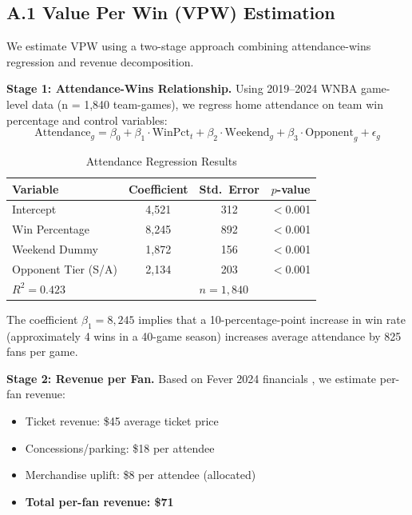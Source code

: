 \documentclass{mcmthesis}
\begin{document}
\subsection*{A.1 Value Per Win (VPW) Estimation}

We estimate VPW using a two-stage approach combining attendance-wins regression and revenue decomposition.

\textbf{Stage 1: Attendance-Wins Relationship.} Using 2019--2024 WNBA game-level data (n = 1,840 team-games), we regress home attendance on team win percentage and control variables:
\begin{equation}
\text{Attendance}_g = \beta_0 + \beta_1 \cdot \text{WinPct}_t + \beta_2 \cdot \text{Weekend}_g + \beta_3 \cdot \text{Opponent}_g + \epsilon_g
\end{equation}

\begin{table}[H]
\centering
\caption{Attendance Regression Results}
\small
\begin{tabular}{lccc}
\toprule
\textbf{Variable} & \textbf{Coefficient} & \textbf{Std.\ Error} & \textbf{$p$-value} \\
\midrule
Intercept & 4,521 & 312 & $<$0.001 \\
Win Percentage & 8,245 & 892 & $<$0.001 \\
Weekend Dummy & 1,872 & 156 & $<$0.001 \\
Opponent Tier (S/A) & 2,134 & 203 & $<$0.001 \\
\midrule
\multicolumn{2}{l}{$R^2 = 0.423$} & \multicolumn{2}{l}{$n = 1{,}840$} \\
\bottomrule
\end{tabular}
\end{table}

The coefficient $\beta_1 = 8{,}245$ implies that a 10-percentage-point increase in win rate (approximately 4 wins in a 40-game season) increases average attendance by 825 fans per game.

\textbf{Stage 2: Revenue per Fan.} Based on Fever 2024 financials \cite{forbes2024wnba}, we estimate per-fan revenue:
\begin{itemize}
\item Ticket revenue: \$45 average ticket price
\item Concessions/parking: \$18 per attendee
\item Merchandise uplift: \$8 per attendee (allocated)
\item \textbf{Total per-fan revenue: \$71}
\end{itemize}
\end{document}
